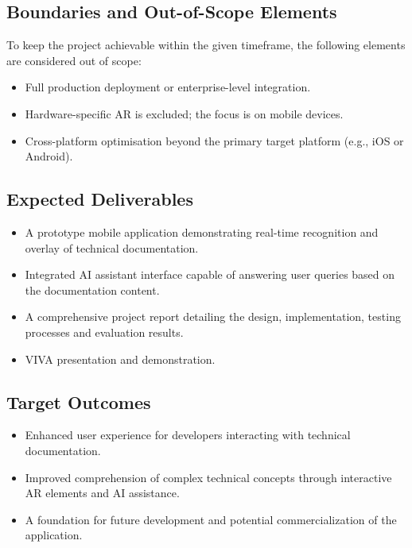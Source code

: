 \documentclass[10pt]{article}
\begin{document}
    \subsection{Boundaries and Out-of-Scope Elements}
    To keep the project achievable within the given timeframe, the following elements are considered out of scope:
    \begin{itemize}
        \item Full production deployment or enterprise-level integration.
        \item Hardware-specific AR is excluded; the focus is on mobile devices.
    \item Cross-platform optimisation beyond the primary target platform (e.g., iOS or Android).
    \end{itemize}

    \subsection{Expected Deliverables}
    \begin{itemize}
        \item A prototype mobile application demonstrating real-time recognition and overlay of technical documentation.
        \item Integrated AI assistant interface capable of answering user queries based on the documentation content.
        \item A comprehensive project report detailing the design, implementation, testing processes and evaluation results.
        \item VIVA presentation and demonstration.
    \end{itemize}

    \subsection{Target Outcomes}
    \begin{itemize}
        \item Enhanced user experience for developers interacting with technical documentation.
        \item Improved comprehension of complex technical concepts through interactive AR elements and AI assistance.
        \item A foundation for future development and potential commercialization of the application.
    \end{itemize}
\end{document}
